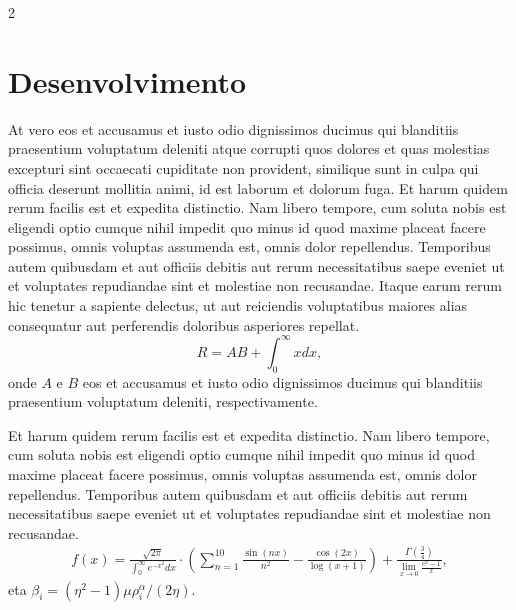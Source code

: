 \documentclass[a0,portrait]{a0poster}
\newcommand{\pa}[1]{\left({#1}\right)}
\begin{document}
\begin{mdframed}[style=MyFrame]
\begin{multicols}{2}
%



\section{Desenvolvimento}\label{section2}
%
At vero eos et accusamus et iusto odio dignissimos ducimus qui blanditiis praesentium voluptatum deleniti atque corrupti quos dolores et quas molestias excepturi sint occaecati cupiditate non provident, similique sunt in culpa qui officia deserunt mollitia animi, id est laborum et dolorum fuga. Et harum quidem rerum facilis est et expedita distinctio. Nam libero tempore, cum soluta nobis est eligendi optio cumque nihil impedit quo minus id quod maxime placeat facere possimus, omnis voluptas assumenda est, omnis dolor repellendus. Temporibus autem quibusdam et aut officiis debitis aut rerum necessitatibus saepe eveniet ut et voluptates repudiandae sint et molestiae non recusandae. Itaque earum rerum hic tenetur a sapiente delectus, ut aut reiciendis voluptatibus maiores alias consequatur aut perferendis doloribus asperiores repellat.
%
\begin{equation}
    R = A B + \int_0^\infty x dx,
\end{equation}
%
onde $A$ e $B$ eos et accusamus et iusto odio dignissimos ducimus qui blanditiis praesentium voluptatum deleniti, respectivamente.

Et harum quidem rerum facilis est et expedita distinctio. Nam libero tempore, cum soluta nobis est eligendi optio cumque nihil impedit quo minus id quod maxime placeat facere possimus, omnis voluptas assumenda est, omnis dolor repellendus. Temporibus autem quibusdam et aut officiis debitis aut rerum necessitatibus saepe eveniet ut et voluptates repudiandae sint et molestiae non recusandae.
%
\begin{equation}\label{eqn:L}
\begin{split}
	f(x) = \frac{\sqrt{2 \pi}}{\int_{0}^{\infty} e^{-x^2} dx} \cdot \left(\sum_{n=1}^{10} \frac{\sin(nx)}{n^2} - \frac{\cos(2x)}{\log(x+1)}\right) + \frac{\Gamma\left(\frac{3}{4}\right)}{\lim_{{x \to 0}} \frac{e^x - 1}{x}},
\end{split}
\end{equation}
%
eta $\beta_i = {\pa{\eta^{2}-1}\mu\rho_{i}^{\alpha}}/{\left({2\eta}\right)}$.


\end{multicols}
\end{mdframed}
\end{document}
